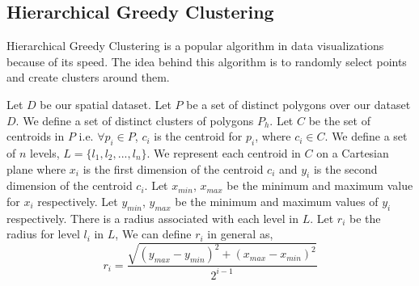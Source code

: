 


\subsection{Hierarchical Greedy Clustering}
Hierarchical Greedy Clustering is a popular algorithm in data visualizations because of its speed. The idea behind this algorithm is to randomly select points and create clusters around them.

Let $D$ be our spatial dataset. Let $P$ be a set of distinct polygons over our dataset $D$. We define a set of distinct clusters of polygons $P_h$. Let $C$ be the set of centroids in $P$ i.e. $\forall p_i \in P$, $c_i$ is the centroid for $p_i$, where $c_i \in C$. We define a set of $n$ levels, $L = \{l_1, l_2,...,l_n\}$. We represent each centroid in $C$ on a Cartesian plane where $x_i$ is the first dimension of the centroid $c_i$ and $y_i$ is the second dimension of the centroid $c_i$. Let $x_{min}$, $x_{max}$ be the minimum and maximum value for $x_i$ respectively. Let $y_{min}$, $y_{max}$ be the minimum and maximum values of $y_i$ respectively. There is a radius associated with each level in $L$. Let $r_i$ be the radius for level $l_i$ in $L$, We can define $r_i$ in general as,
$$r_i = \frac{\sqrt{(y_{max}-y_{min})^2+(x_{max}-x_{min})^2}}{2^{i-1}}$$

